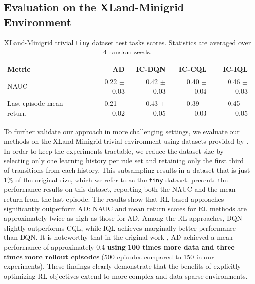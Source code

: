 \documentclass{article}
\begin{document}
\subsection{Evaluation on the XLand-Minigrid Environment}
\begin{table}[ht]
\centering
\caption{XLand-Minigrid trivial \texttt{tiny} dataset test tasks scores. Statistics are averaged over 4 random seeds.}
\label{table:xland}
\begin{tabular}{l|rrrr}
\toprule
\textbf{Metric} & \textbf{AD} & \textbf{IC-DQN} & \textbf{IC-CQL} & \textbf{IC-IQL}\\
\midrule
NAUC &  0.22 $\pm$ 0.03 & 0.42 $\pm$ 0.03 & 0.40 $\pm$ 0.04 & 0.46 $\pm$ 0.03\\
Last episode mean return & 0.21 $\pm$ 0.02 & 0.43 $\pm$ 0.05 & 0.39 $\pm$ 0.03 & 0.45 $\pm$ 0.05 \\
\bottomrule
\end{tabular}
\label{tab:xland-result}
\end{table}
To further validate our approach in more challenging settings, we evaluate our methods on the XLand-Minigrid trivial environment \citep{nikulin2023xland} using datasets provided by \citet{nikulin2024xland}. In order to keep the experiments tractable, we reduce the dataset size by selecting only one learning history per rule set and retaining only the first third of transitions from each history. This subsampling results in a dataset that is just 1\% of the original size, which we refer to as the \texttt{tiny} dataset.
 presents the performance results on this dataset, reporting both the NAUC and the mean return from the last episode. The results show that RL-based approaches significantly outperform AD: NAUC and mean return scores for RL methods are approximately twice as high as those for AD. Among the RL approaches, DQN slightly outperforms CQL, while IQL achieves marginally better performance than DQN.
It is noteworthy that in the original work \citep{nikulin2024xland}, AD achieved a mean performance of approximately 0.4 \textbf{using 100 times more data and three times more rollout episodes} (500 episodes compared to 150 in our experiments). These findings clearly demonstrate that the benefits of explicitly optimizing RL objectives extend to more complex and data-sparse environments.
\end{document}
